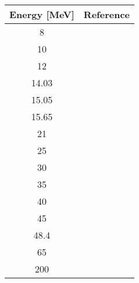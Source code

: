 \begin{tabular}{|c||c|} 
    \hline 
    \bf{Energy [MeV]} & \bf{Reference} \\
    \hline
    \hline 
    8 & \cite{Liers71}\\
    10 & \cite{Liers71}\\
    12 & \cite{Liers71}\\
    14.03 & \cite{Lombardi72}\\
    15.05 & \cite{Lombardi72}\\
    15.65 & \cite{Lombardi72}\\
    21 & \cite{Mccamis86}\\
    25 & \cite{Mccamis86}\\
    30 & \cite{Mccamis86}\\
    35 & \cite{Mccamis86}\\
    40 & \cite{Mccamis86}\\
    45 & \cite{Mccamis86}\\
    48.4 & \cite{Mccamis86}\\
    65 & \cite{Noro81}\\
    200 & \cite{Murdock87}\\
    \hline
\end{tabular}

